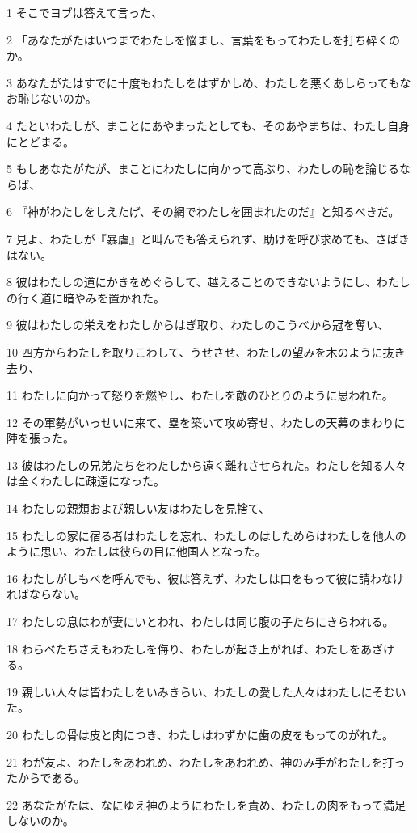 \par 1 そこでヨブは答えて言った、
\par 2 「あなたがたはいつまでわたしを悩まし、言葉をもってわたしを打ち砕くのか。
\par 3 あなたがたはすでに十度もわたしをはずかしめ、わたしを悪くあしらってもなお恥じないのか。
\par 4 たといわたしが、まことにあやまったとしても、そのあやまちは、わたし自身にとどまる。
\par 5 もしあなたがたが、まことにわたしに向かって高ぶり、わたしの恥を論じるならば、
\par 6 『神がわたしをしえたげ、その網でわたしを囲まれたのだ』と知るべきだ。
\par 7 見よ、わたしが『暴虐』と叫んでも答えられず、助けを呼び求めても、さばきはない。
\par 8 彼はわたしの道にかきをめぐらして、越えることのできないようにし、わたしの行く道に暗やみを置かれた。
\par 9 彼はわたしの栄えをわたしからはぎ取り、わたしのこうべから冠を奪い、
\par 10 四方からわたしを取りこわして、うせさせ、わたしの望みを木のように抜き去り、
\par 11 わたしに向かって怒りを燃やし、わたしを敵のひとりのように思われた。
\par 12 その軍勢がいっせいに来て、塁を築いて攻め寄せ、わたしの天幕のまわりに陣を張った。
\par 13 彼はわたしの兄弟たちをわたしから遠く離れさせられた。わたしを知る人々は全くわたしに疎遠になった。
\par 14 わたしの親類および親しい友はわたしを見捨て、
\par 15 わたしの家に宿る者はわたしを忘れ、わたしのはしためらはわたしを他人のように思い、わたしは彼らの目に他国人となった。
\par 16 わたしがしもべを呼んでも、彼は答えず、わたしは口をもって彼に請わなければならない。
\par 17 わたしの息はわが妻にいとわれ、わたしは同じ腹の子たちにきらわれる。
\par 18 わらべたちさえもわたしを侮り、わたしが起き上がれば、わたしをあざける。
\par 19 親しい人々は皆わたしをいみきらい、わたしの愛した人々はわたしにそむいた。
\par 20 わたしの骨は皮と肉につき、わたしはわずかに歯の皮をもってのがれた。
\par 21 わが友よ、わたしをあわれめ、わたしをあわれめ、神のみ手がわたしを打ったからである。
\par 22 あなたがたは、なにゆえ神のようにわたしを責め、わたしの肉をもって満足しないのか。
